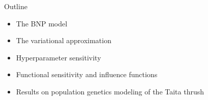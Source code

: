 \begin{frame}{Outline}
\begin{itemize}
\item The BNP model
\vspace{0.1in}

\item The variational approximation
\vspace{0.1in}

\item Hyperparameter sensitivity
\vspace{0.1in}

\item Functional sensitivity and influence functions
\vspace{0.1in}

\item Results on population genetics modeling of the Taita thrush
\vspace{0.1in}

\end{itemize}
\end{frame}
